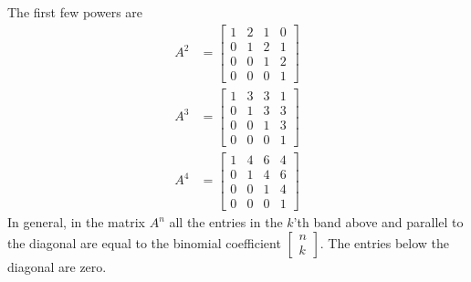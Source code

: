 \documentclass{amsart}
\newcommand{\bsm}       {\left[\begin{smallmatrix}}
\newcommand{\esm}       {\end{smallmatrix}\right]}
\renewcommand{\:}{\colon}
\theoremstyle{definition}
\renewenvironment{solution}{\SolutionAtEnd}{\endSolutionAtEnd}
\begin{document}
\begin{solution}
 The first few powers are
 \begin{align*}
  A^2 &= \bsm 1&2&1&0 \\
              0&1&2&1 \\
              0&0&1&2 \\
              0&0&0&1 \esm \\
  A^3 &= \bsm 1&3&3&1 \\
              0&1&3&3 \\
              0&0&1&3 \\
              0&0&0&1 \esm \\
  A^4 &= \bsm 1&4&6&4 \\
              0&1&4&6 \\
              0&0&1&4 \\
              0&0&0&1 \esm
 \end{align*}
 In general, in the matrix $A^n$ all the entries in the $k$'th band
 above and parallel to the diagonal are equal to the binomial
 coefficient $\bsm n\\k\esm$.  The entries below the diagonal are
 zero. 
\end{solution}
\end{document}
